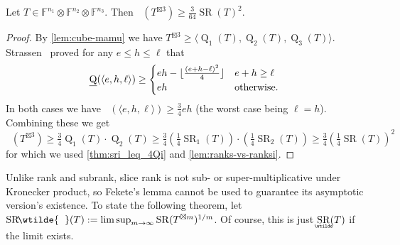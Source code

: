 \documentclass{daj}
\DeclareMathOperator{\subrank}{Q}
\DeclareMathOperator{\slicerank}{SR}
\DeclareMathOperator{\asympslicerank}{\underaccent{\wtilde}{SR}}
\DeclareMathOperator{\asympsupslicerank}{{SR}\!\wtilde{\phantom{X}\!\!}}
\DeclareMathOperator{\bordersubrank}{\underline{Q}}
\newcommand{\FF}{\mathbb{F}}
\begin{document}
%
%

%
%
%




%

%

%

%

\begin{lemma}\label{lem:b-subr-sr}
    Let $T \in \FF^{n_1} \otimes \FF^{n_2} \otimes \FF^{n_3}$. Then %
    $\bordersubrank(T^{\boxtimes 3})\geq
    \frac{3}{64}\slicerank(T)^2$.
\end{lemma}

\begin{proof}
    By \autoref{lem:cube-mamu} we have $T^{\boxtimes 3}\geq\langle\subrank_{1}(T),\subrank_2(T),\subrank_3(T) \rangle$.
    Strassen~\cite[Theorem~6.6]{MR882307} proved  for any $e\leq h\leq \ell$ that
    \[
    \bordersubrank(\langle e,h,\ell\rangle)\geq \begin{cases}
    eh-\lfloor\frac{(e+h-\ell)^2}{4}\rfloor &e+h\geq\ell\\
    eh &\textnormal{otherwise}.
    \end{cases}
    \]
    In both cases we have $\bordersubrank(\langle e,h,\ell\rangle)\geq \frac{3}{4}eh$ (the worst case being $\ell=h$).
    Combining these we get 
        \[\bordersubrank(T^{\boxtimes 3})\geq \tfrac34\subrank_1(T)\cdot\subrank_2(T)
        \geq\tfrac34(\tfrac14\slicerank_1(T))\cdot(\tfrac14\slicerank_2(T))\geq \tfrac34(\tfrac14\slicerank(T))^2
        \]
    for which we used \autoref{thm:sri_leq_4Qi} and \autoref{lem:ranks-vs-ranksi}.
\end{proof}

%
%
Unlike rank and subrank, slice rank is not sub- or super-multiplicative under Kronecker product, so Fekete's lemma cannot be used to guarantee its asymptotic version's existence. 
To state the following theorem, let $\asympsupslicerank(T):=\limsup_{m\to\infty} \slicerank(T^{\boxtimes m})^{1/m}$. Of course, this is just $\asympslicerank(T)$ if the limit exists.
\end{document}
